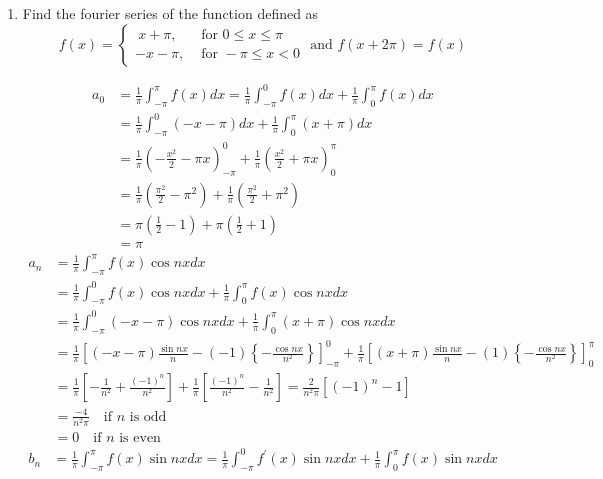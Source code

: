 \begin{enumerate}[label=\color{ocre}\textbf{\arabic*.}]
\item Find the fourier series of the function defined as
$$
f(x)=\left\{\begin{array}{ll}
 \left.  \right. \ x+\pi, & \text { for } 0 \leq x \leq \pi \\
-x-\pi, & \text { for }-\pi \leq x<0
\end{array} \text { and } f(x+2 \pi)=f(x)\right.
$$	
\begin{answer}
	\begin{align*}
		a_{0} &=\frac{1}{\pi} \int_{-\pi}^{\pi} f(x) d x=\frac{1}{\pi} \int_{-\pi}^{0} f(x) d x+\frac{1}{\pi} \int_{0}^{\pi} f(x) d x \\
		&=\frac{1}{\pi} \int_{-\pi}^{0}(-x-\pi) d x+\frac{1}{\pi} \int_{0}^{\pi}(x+\pi) d x\\&=\frac{1}{\pi}\left(-\frac{x^{2}}{2}-\pi x\right)_{-\pi}^{0}+\frac{1}{\pi}\left(\frac{x^{2}}{2}+\pi x\right)_{0}^{\pi} \\
		&=\frac{1}{\pi}\left(\frac{\pi^{2}}{2}-\pi^{2}\right)+\frac{1}{\pi}\left(\frac{\pi^{2}}{2}+\pi^{2}\right)\\&=\pi\left(\frac{1}{2}-1\right)+\pi\left(\frac{1}{2}+1\right)\\&=\pi
	\end{align*}
	\begin{align*}
		a_{n} &=\frac{1}{\pi} \int_{-\pi}^{\pi} f(x) \cos n x d x\\&=\frac{1}{\pi} \int_{-\pi}^{0} f(x) \cos n x d x+\frac{1}{\pi} \int_{0}^{\pi} f(x) \cos n x d x \\
		&=\frac{1}{\pi} \int_{-\pi}^{0}(-x-\pi) \cos n x d x+\frac{1}{\pi} \int_{0}^{\pi}(x+\pi) \cos n x d x \\
		&=\frac{1}{\pi}\left[(-x-\pi) \frac{\sin n x}{n}-(-1)\left\{-\frac{\cos n x}{n^{2}}\right\}\right]_{-\pi}^{0}+\frac{1}{\pi}\left[(x+\pi) \frac{\sin n x}{n}-(1)\left\{-\frac{\cos n x}{n^{2}}\right\}\right]_{0}^{\pi}\\
		&=\frac{1}{\pi}\left[-\frac{1}{n^{2}}+\frac{(-1)^{n}}{n^{2}}\right]+\frac{1}{\pi}\left[\frac{(-1)^{n}}{n^{2}}-\frac{1}{n^{2}}\right]=\frac{2}{n^{2} \pi}\left[(-1)^{n}-1\right]\\
		&=\frac{-4}{n^{2} \pi}\quad \text{if $n$ is odd}\\
		&=0 \quad \text{if $n$ is even}
	\end{align*}
	\begin{align*}
		b_{n} &=\frac{1}{\pi} \int_{-\pi}^{\pi} f(x) \sin n x d x=\frac{1}{\pi} \int_{-\pi}^{0} f^{\prime}(x) \sin n x d x+\frac{1}{\pi} \int_{0}^{\pi} f(x) \sin n x d x \\

\end{align*}
\end{answer}
\end{enumerate}
